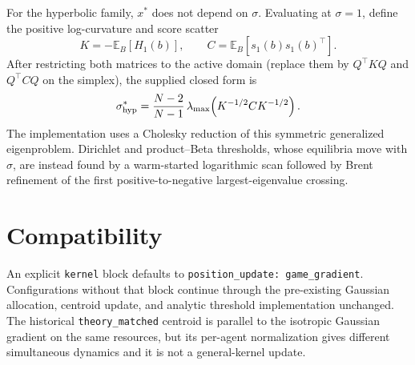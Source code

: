 \documentclass[11pt]{article}
\newcommand{\E}{\mathbb{E}}
\newcommand{\cfg}[1]{\texttt{#1}}
\begin{document}
For the hyperbolic family, $x^*$ does not depend on $\sigma$.  Evaluating at
$\sigma=1$, define the positive log-curvature and score scatter
\[
K=-\E_B[H_1(b)],\qquad C=\E_B[s_1(b)s_1(b)^\top].
\]
After restricting both matrices to the active domain (replace them by
$Q^\top KQ$ and $Q^\top CQ$ on the simplex), the supplied closed form is
\[
\sigma^*_{\rm hyp}=\frac{N-2}{N-1}\,
\lambda_{\max}\!\left(K^{-1/2}CK^{-1/2}\right).
\]
The implementation uses a Cholesky reduction of this symmetric generalized
eigenproblem.  Dirichlet and product--Beta thresholds, whose equilibria move
with $\sigma$, are instead found by a warm-started logarithmic scan followed
by Brent refinement of the first positive-to-negative largest-eigenvalue
crossing.

\section{Compatibility}

An explicit \cfg{kernel} block defaults to
\cfg{position\_update: game\_gradient}.  Configurations without that block
continue through the pre-existing Gaussian allocation, centroid update, and
analytic threshold implementation unchanged.  The historical
\cfg{theory\_matched} centroid is parallel to the isotropic Gaussian gradient
on the same resources, but its per-agent normalization gives different
simultaneous dynamics and it is not a general-kernel update.
\end{document}
